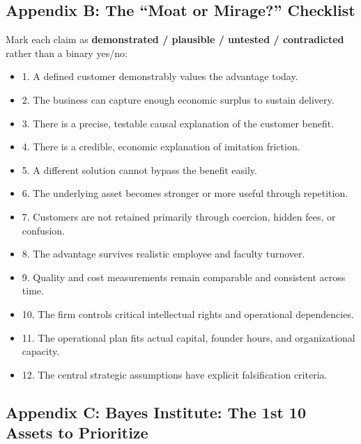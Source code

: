 \subsection*{Appendix B: The ``Moat or Mirage?'' Checklist}
\label{sec:appendix_b_moat_or_mirage_checklist}

Mark each claim as \textbf{demonstrated / plausible / untested / contradicted} rather than a binary yes/no:
\begin{itemize}
    \item[$\square$] 1. A defined customer demonstrably values the advantage today.
    \item[$\square$] 2. The business can capture enough economic surplus to sustain delivery.
    \item[$\square$] 3. There is a precise, testable causal explanation of the customer benefit.
    \item[$\square$] 4. There is a credible, economic explanation of imitation friction.
    \item[$\square$] 5. A different solution cannot bypass the benefit easily.
    \item[$\square$] 6. The underlying asset becomes stronger or more useful through repetition.
    \item[$\square$] 7. Customers are not retained primarily through coercion, hidden fees, or confusion.
    \item[$\square$] 8. The advantage survives realistic employee and faculty turnover.
    \item[$\square$] 9. Quality and cost measurements remain comparable and consistent across time.
    \item[$\square$] 10. The firm controls critical intellectual rights and operational dependencies.
    \item[$\square$] 11. The operational plan fits actual capital, founder hours, and organizational capacity.
    \item[$\square$] 12. The central strategic assumptions have explicit falsification criteria.
\end{itemize}

\subsection*{Appendix C: Bayes Institute: The 1st 10 Assets to Prioritize}
\label{sec:appendix_c_bayes_first_ten_assets}

